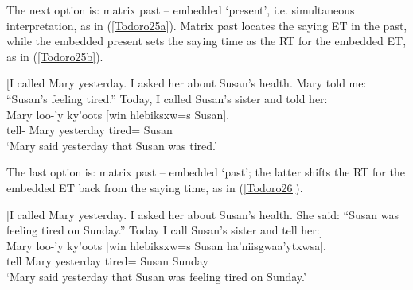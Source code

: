 \documentclass[output=paper]{langscibook}
\begin{document}
The next option is: matrix past -- embedded ‘present’, i.e. simultaneous interpretation, as in (\ref{Todoro25a}). Matrix past locates the saying ET in the past, while the embedded present sets the saying time as the RT for the embedded ET, as in  (\ref{Todoro25b}). 

\begin{exe}
\ex \label{Todoro25}
\begin{xlist}

\ex \label{Todoro25a} [I called Mary yesterday. I asked her about Susan’s health. Mary    
    told me: ``Susan’s feeling tired.'' Today, I called Susan’s sister and   
     told her:]\\
 	  {Mary}  {loo-’y}  {ky'oots}        [{win} {hlebiksxw=s} 	     {Susan}]. \\
    tell- Mary   yesterday  {} tired=	     Susan \\
\glt ‘Mary said yesterday that Susan was tired.’ 

\ex \label{Todoro25b}

\end{xlist}
\end{exe}

The last option is: matrix past -- embedded ‘past’; the latter shifts the RT for the embedded ET back from the saying time, as in (\ref{Todoro26}). 

\begin{exe}
\ex \label{Todoro26}
\begin{xlist}

\ex \label{Todoro26a} [I called Mary yesterday. I asked her about Susan’s health. She   
     said: ``Susan was feeling tired on Sunday.'' Today I call Susan’s 
     sister and tell her:]\\
 {Mary}  {loo-’y} {ky'oots} [{win} {hlebiksxw=s} {Susan} {ha’niisgwaa’ytxwsa}].  \\
    tell Mary  yesterday  tired= Susan Sunday \\
\glt ‘Mary said yesterday that Susan was feeling tired on Sunday.’ 

\ex \label{Todoro26b}

\end{xlist}
\end{exe}
\end{document}
